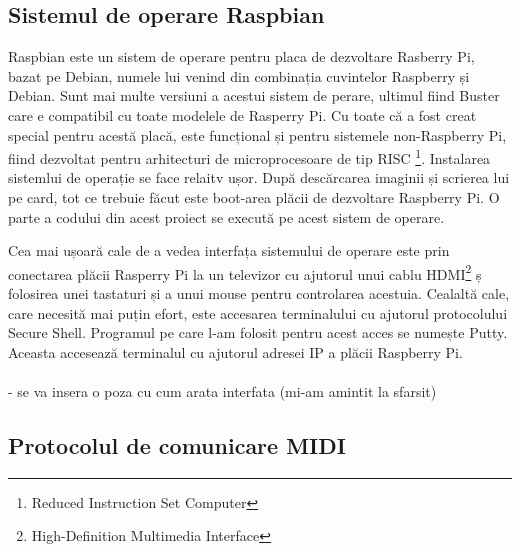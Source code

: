 \documentclass[../IoMusT.tex]{subfiles}
\begin{document}
\subsection{Sistemul de operare Raspbian}
Raspbian este un sistem de operare pentru placa de dezvoltare Rasberry Pi, bazat pe Debian, numele lui venind din combinația cuvintelor Raspberry și Debian. Sunt mai multe versiuni a acestui sistem de perare, ultimul fiind Buster care e compatibil cu toate modelele de Rasperry Pi. Cu toate că a fost creat special pentru acestă placă, este funcțional și pentru sistemele non-Raspberry Pi, fiind dezvoltat pentru arhitecturi de microprocesoare de tip RISC \footnote{Reduced Instruction Set Computer}. Instalarea sistemlui de operație se face relaitv ușor. După descărcarea imaginii și scrierea lui pe card, tot ce trebuie făcut este boot-area plăcii de dezvoltare Raspberry Pi. O parte a codului din acest proiect se execută pe acest sistem de operare.
\\
\par Cea mai ușoară cale de a vedea interfața sistemului de operare este prin conectarea plăcii Rasperry Pi la un televizor cu ajutorul unui cablu HDMI\footnote{High-Definition Multimedia Interface} ș folosirea unei tastaturi și a unui mouse pentru controlarea acestuia. Cealaltă cale, care necesită mai puțin efort, este accesarea terminalului cu ajutorul protocolului Secure Shell. Programul pe care l-am folosit pentru acest acces se numește Putty. Aceasta accesează terminalul cu ajutorul adresei IP a plăcii Raspberry Pi.
\\
\\
- se va insera o poza cu cum arata interfata (mi-am amintit la sfarsit)
\subsection{Protocolul de comunicare MIDI}
\end{document}

